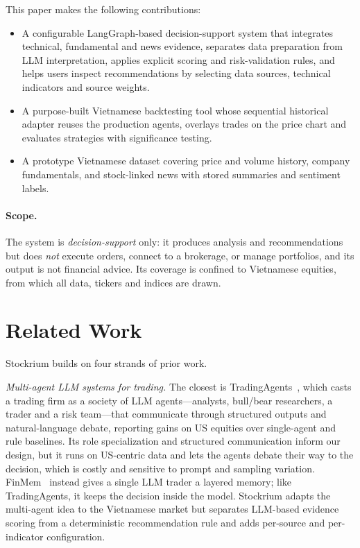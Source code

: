 \documentclass[runningheads]{llncs}
\begin{document}
This paper makes the following contributions:
\begin{itemize}
\item A configurable LangGraph-based decision-support system that integrates
technical, fundamental and news evidence, separates data preparation from LLM
interpretation, applies explicit scoring and risk-validation rules, and helps users
inspect recommendations by selecting data sources, technical indicators and source
weights.
\item A purpose-built Vietnamese backtesting tool whose sequential
historical adapter reuses the production agents, overlays trades on the price chart
and evaluates strategies with significance testing.
\item A prototype Vietnamese dataset covering price and volume history, company
fundamentals, and stock-linked news with stored summaries and sentiment labels.
\end{itemize}

\paragraph{Scope.}
The system is \emph{decision-support} only: it produces analysis and
recommendations but does \emph{not} execute orders, connect to a brokerage, or
manage portfolios, and its output is not financial advice. Its coverage is
confined to Vietnamese equities, from which all data, tickers and indices are
drawn.
\section{Related Work}
\label{sec:related}

Stockrium builds on four strands of prior work.

\emph{Multi-agent LLM systems for trading.} The closest is
TradingAgents~\cite{tradingagents}, which casts a trading firm as a society of LLM
agents---analysts, bull/bear researchers, a trader and a risk team---that
communicate through structured outputs and natural-language debate, reporting gains
on US equities over single-agent and rule baselines. Its role specialization and
structured communication inform our design, but it runs on US-centric data and lets
the agents debate their way to the decision, which is costly and sensitive to
prompt and sampling variation. FinMem~\cite{finmem} instead gives a single LLM
trader a layered memory; like TradingAgents, it keeps the decision inside the
model. Stockrium adapts the multi-agent idea to the Vietnamese market but separates
LLM-based evidence scoring from a deterministic recommendation rule and adds
per-source and per-indicator configuration.
\end{document}
